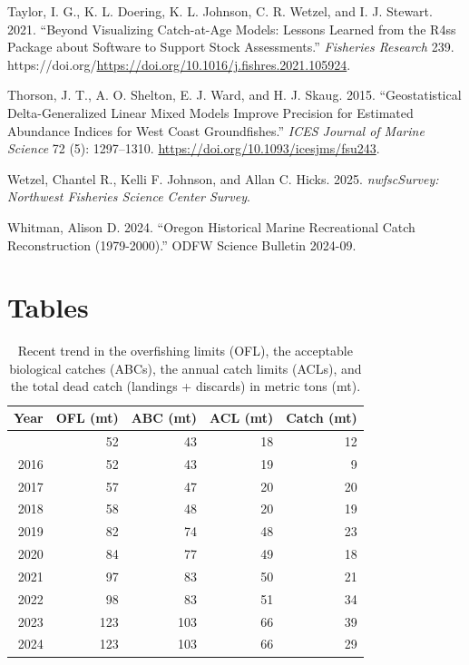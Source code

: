 \documentclass[
]{scrartcl}
\newlength{\cslhangindent}
\newenvironment{CSLReferences}[2] %
 {\begin{list}{}{%
  \setlength{\itemindent}{0pt}
  \setlength{\leftmargin}{0pt}
  \setlength{\parsep}{0pt}
  \ifodd #1
   \setlength{\leftmargin}{\cslhangindent}
   \setlength{\itemindent}{-1\cslhangindent}
  \fi
  \setlength{\itemsep}{#2\baselineskip}}}
 {\end{list}}
\begin{document}
\begin{CSLReferences}{1}{0}
Taylor, I. G., K. L. Doering, K. L. Johnson, C. R. Wetzel, and I. J.
Stewart. 2021. {``Beyond Visualizing Catch-at-Age Models: Lessons
Learned from the R4ss Package about Software to Support Stock
Assessments.''} \emph{Fisheries Research} 239.
https://doi.org/\url{https://doi.org/10.1016/j.fishres.2021.105924}.

Thorson, J. T., A. O. Shelton, E. J. Ward, and H. J. Skaug. 2015.
{``Geostatistical Delta-Generalized Linear Mixed Models Improve
Precision for Estimated Abundance Indices for {West} {Coast}
Groundfishes.''} \emph{ICES Journal of Marine Science} 72 (5):
1297--1310. \url{https://doi.org/10.1093/icesjms/fsu243}.

Wetzel, Chantel R., Kelli F. Johnson, and Allan C. Hicks. 2025.
\emph{nwfscSurvey: Northwest Fisheries Science Center Survey}.

Whitman, Alison D. 2024. {``Oregon Historical Marine Recreational Catch
Reconstruction (1979-2000).''} ODFW Science Bulletin 2024-09.

\end{CSLReferences}

\newpage{}

\section{Tables}\label{tables}

\begingroup
\fontsize{9.0pt}{10.8pt}\selectfont

\begin{longtable}{rrrrr}

\caption{\label{tbl-ye-management}Recent trend in the overfishing limits
(OFL), the acceptable biological catches (ABCs), the annual catch limits
(ACLs), and the total dead catch (landings + discards) in metric tons
(mt).}

\tabularnewline

\toprule
Year & OFL (mt) & ABC (mt) & ACL (mt) & Catch (mt) \\ 
\midrule\addlinespace[2.5pt]
2015 & 52 & 43 & 18 & 12 \\ 
2016 & 52 & 43 & 19 & 9 \\ 
2017 & 57 & 47 & 20 & 20 \\ 
2018 & 58 & 48 & 20 & 19 \\ 
2019 & 82 & 74 & 48 & 23 \\ 
2020 & 84 & 77 & 49 & 18 \\ 
2021 & 97 & 83 & 50 & 21 \\ 
2022 & 98 & 83 & 51 & 34 \\ 
2023 & 123 & 103 & 66 & 39 \\ 
2024 & 123 & 103 & 66 & 29 \\ 
\bottomrule

\end{longtable}
\end{document}
